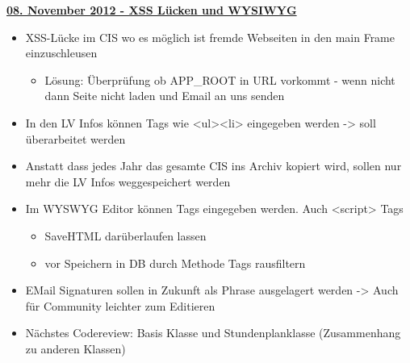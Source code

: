 \underline{{\bf 08. November 2012 - XSS L\"ucken und WYSIWYG}}
\begin{itemize}
	\item XSS-L\"ucke im CIS wo es m\"oglich ist fremde Webseiten in den main Frame einzuschleusen
		\begin{itemize}
		\item L\"osung: \"Uberpr\"ufung ob APP\_ROOT in URL vorkommt - wenn nicht dann Seite nicht laden und Email an uns senden
		\end{itemize}
	\item In den LV Infos k\"onnen Tags wie <ul><li> eingegeben werden -> soll \"uberarbeitet werden
	\item Anstatt dass jedes Jahr das gesamte CIS ins Archiv kopiert wird, sollen nur mehr die LV Infos weggespeichert werden
	\item Im WYSWYG Editor können Tags eingegeben werden. Auch <script> Tags
		\begin{itemize}
		\item SaveHTML dar\"uberlaufen lassen
		\item vor Speichern in DB durch Methode Tags rausfiltern
		\end{itemize}
	\item EMail Signaturen sollen in Zukunft als Phrase ausgelagert werden -> Auch für Community leichter zum Editieren \newline
	\item N\"achstes Codereview: Basis Klasse und Stundenplanklasse (Zusammenhang zu anderen Klassen)
\end{itemize}
